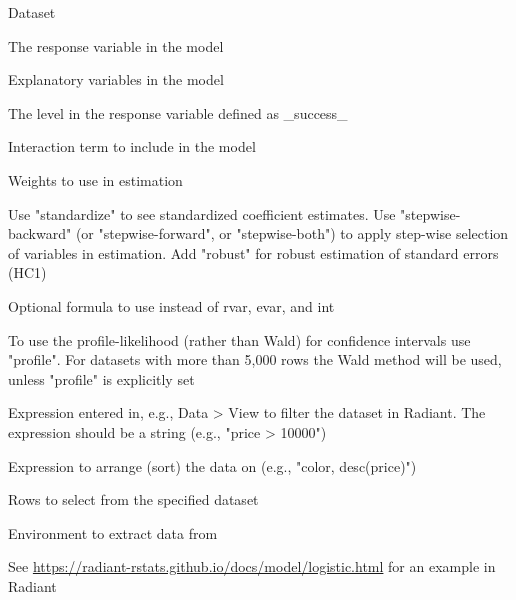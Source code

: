 \documentclass[a4paper]{book}
\begin{document}
%
\begin{Arguments}
\begin{ldescription}
\item[\code{dataset}] Dataset

\item[\code{rvar}] The response variable in the model

\item[\code{evar}] Explanatory variables in the model

\item[\code{lev}] The level in the response variable defined as \_success\_

\item[\code{int}] Interaction term to include in the model

\item[\code{wts}] Weights to use in estimation

\item[\code{check}] Use "standardize" to see standardized coefficient estimates. Use "stepwise-backward" (or "stepwise-forward", or "stepwise-both") to apply step-wise selection of variables in estimation. Add "robust" for robust estimation of standard errors (HC1)

\item[\code{form}] Optional formula to use instead of rvar, evar, and int

\item[\code{ci\_type}] To use the profile-likelihood (rather than Wald) for confidence intervals use "profile". For datasets with more than 5,000 rows the Wald method will be used, unless "profile" is explicitly set

\item[\code{data\_filter}] Expression entered in, e.g., Data > View to filter the dataset in Radiant. The expression should be a string (e.g., "price > 10000")

\item[\code{arr}] Expression to arrange (sort) the data on (e.g., "color, desc(price)")

\item[\code{rows}] Rows to select from the specified dataset

\item[\code{envir}] Environment to extract data from
\end{ldescription}
\end{Arguments}
%
\begin{Details}
See \url{https://radiant-rstats.github.io/docs/model/logistic.html} for an example in Radiant
\end{Details}
\end{document}
